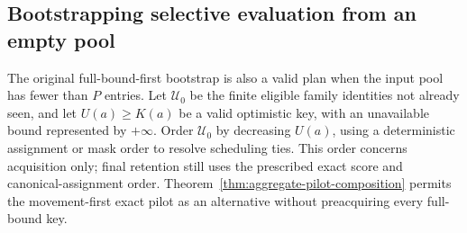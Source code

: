 \documentclass[11pt]{article}
\begin{document}
\subsection{Bootstrapping selective evaluation from an empty pool}
The original full-bound-first bootstrap is also a valid plan when the input pool has fewer than $P$ entries. Let $\mathcal U_0$ be the finite eligible family identities not already seen, and let $U(a)\ge K(a)$ be a valid optimistic key, with an unavailable bound represented by $+\infty$. Order $\mathcal U_0$ by decreasing $U(a)$, using a deterministic assignment or mask order to resolve scheduling ties. This order concerns acquisition only; final retention still uses the prescribed exact score and canonical-assignment order. Theorem~\ref{thm:aggregate-pilot-composition} permits the movement-first exact pilot as an alternative without preacquiring every full-bound key.
\end{document}

